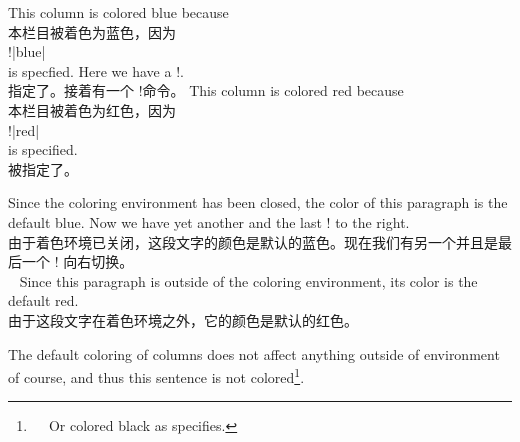 \begin{description}
\begin{itemize}
\twosided[]
\begin{paracol}{2}
This column is colored blue because\\
本栏目被着色为蓝色，因为\\
\mbox{}\qquad \!\columncolor!|{blue}|\\
is specfied.  Here we have a \!\switchcolumn!.\\
指定了。接着有一个 \!\switchcolumn!命令。
\switchcolumn
{}
This column is colored red because\\
本栏目被着色为红色，因为\\
\mbox{}\qquad\!\columncolor!|{red}|\\
is specified.\\
被指定了。

%

Since the coloring environment has been closed, the color of this
paragraph is the default blue.  Now we have yet another and the last
\!\switchcolumn! to the right.\\
由于着色环境已关闭，这段文字的颜色是默认的蓝色。现在我们有另一个并且是最后一个 \!\switchcolumn! 向右切换。\\\
\switchcolumn
Since this paragraph is outside of the coloring environment, its color is
the default red.
\\由于这段文字在着色环境之外，它的颜色是默认的红色。
\end{paracol}

\normalcolumncolor[0]\normalcolumncolor[1]
The default coloring of columns does not affect anything outside of
\env{paracol} environment of course, and thus this sentence is not
colored\footnote{

Or colored black as  specifies.}.


\end{itemize}
\end{description}
